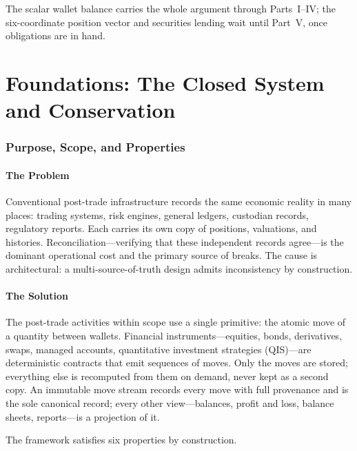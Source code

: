 \documentclass[11pt,a4paper]{article}
\begin{document}
The scalar wallet balance carries the whole argument through Parts~I--IV; the
six-coordinate position vector and securities lending wait until Part~V, once obligations
are in hand.

\clearpage

\part{Foundations: The Closed System and Conservation}
\section{Purpose, Scope, and Properties}
\label{sec:intro}

\subsection{The Problem}

Conventional post-trade infrastructure records the same economic reality in many places: trading systems, risk engines, general ledgers, custodian records, regulatory reports. Each carries its own copy of positions, valuations, and histories. Reconciliation---verifying that these independent records agree---is the dominant operational cost and the primary source of breaks. The cause is architectural: a multi-source-of-truth design admits inconsistency by construction.

\subsection{The Solution}

The post-trade activities within scope use a single primitive: the atomic move of a quantity between wallets. Financial instruments---equities, bonds, derivatives, swaps, managed accounts, quantitative investment strategies (QIS)---are deterministic contracts that emit sequences of moves. Only the moves are stored; everything else is recomputed from them on demand, never kept as a second copy. An immutable move stream records every move with full provenance and is the sole canonical record; every other view---balances, profit and loss, balance sheets, reports---is a projection of it.

The framework satisfies six properties by construction.
\end{document}
